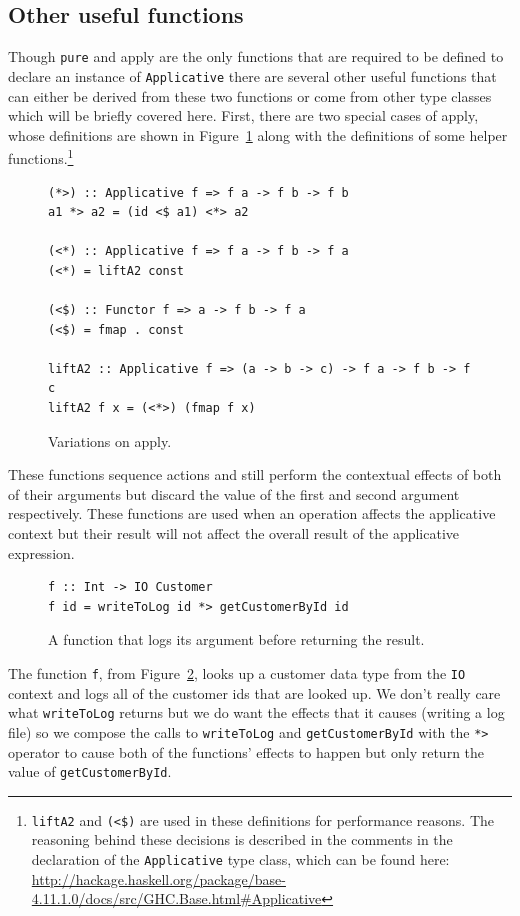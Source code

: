 \subsection{Other useful functions}
\label{sec:useful}
Though \texttt{pure} and apply are the only functions that are required to be defined to declare an instance of \texttt{Applicative} there are several other useful functions that can either be derived from these two functions or come from other type classes which will be briefly covered here. First, there are two special cases of apply, whose definitions are shown in Figure~\ref{appVars} along with the definitions of some helper functions.\footnote{\texttt{liftA2} and \texttt{(<\$)} are used in these definitions for performance reasons. The reasoning behind these decisions is described in the comments in the declaration of the \texttt{Applicative} type class, which can be found here: \url{http://hackage.haskell.org/package/base-4.11.1.0/docs/src/GHC.Base.html\#Applicative}}

\begin{figure}[t]
\begin{lstlisting}
(*>) :: Applicative f => f a -> f b -> f b
a1 *> a2 = (id <$ a1) <*> a2

(<*) :: Applicative f => f a -> f b -> f a
(<*) = liftA2 const

(<$) :: Functor f => a -> f b -> f a
(<$) = fmap . const

liftA2 :: Applicative f => (a -> b -> c) -> f a -> f b -> f c
liftA2 f x = (<*>) (fmap f x)

\end{lstlisting}
\caption{Variations on apply.}
\label{appVars}
\end{figure}

These functions sequence actions and still perform the contextual effects of both of their arguments but discard the value of the first and second argument respectively. These functions are used when an operation affects the applicative context but their result will not affect the overall result of the applicative expression. 

\begin{figure}[t]
\begin{lstlisting}
f :: Int -> IO Customer
f id = writeToLog id *> getCustomerById id
\end{lstlisting}
\caption{A function that logs its argument before returning the result.}
\label{logApp}
\end{figure}

The function \texttt{f}, from Figure~\ref{logApp}, looks up a customer data type from the \texttt{IO} context and logs all of the customer ids that are looked up. We don't really care what \texttt{writeToLog} returns but we do want the effects that it causes (writing a log file) so we compose the calls to \texttt{writeToLog} and \texttt{getCustomerById} with the \texttt{*>} operator to cause both of the functions' effects to happen but only return the value of \texttt{getCustomerById}.

